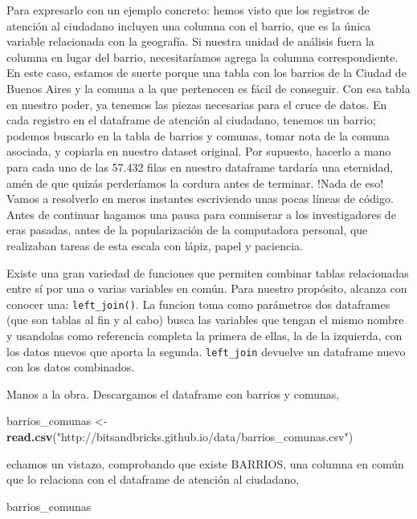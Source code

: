 \documentclass[]{book}
\newenvironment{Shaded}{\begin{snugshade}}{\end{snugshade}}
\newcommand{\KeywordTok}[1]{\textcolor[rgb]{0.13,0.29,0.53}{\textbf{#1}}}
\newcommand{\StringTok}[1]{\textcolor[rgb]{0.31,0.60,0.02}{#1}}
\newcommand{\NormalTok}[1]{#1}
\begin{document}
Para expresarlo con un ejemplo concreto: hemos visto que los registros
de atención al ciudadano incluyen una columna con el barrio, que es la
única variable relacionada con la geografía. Si nuestra unidad de
análisis fuera la columna en lugar del barrio, necesitaríamos agrega la
columna correspondiente. En este caso, estamos de suerte porque una
tabla con los barrios de la Ciudad de Buenos Aires y la comuna a la que
pertenecen es fácil de conseguir. Con esa tabla en nuestro poder, ya
tenemos las piezas necesarias para el cruce de datos. En cada registro
en el dataframe de atención al ciudadano, tenemos un barrio; podemos
buscarlo en la tabla de barrios y comunas, tomar nota de la comuna
asociada, y copiarla en nuestro dataset original. Por supuesto, hacerlo
a mano para cada uno de las 57.432 filas en nuestro dataframe tardaría
una eternidad, amén de que quizás perderíamos la cordura antes de
terminar. !Nada de eso! Vamos a resolverlo en meros instantes
escriviendo unas pocas líneas de código. Antes de continuar hagamos una
pausa para conmiserar a los investigadores de eras pasadas, antes de la
popularización de la computadora personal, que realizaban tareas de esta
escala con lápiz, papel y paciencia.

Existe una gran variedad de funciones que permiten combinar tablas
relacionadas entre sí por una o varias variables en común. Para nuestro
propósito, alcanza con conocer una: \texttt{left\_join()}. La funcion
toma como parámetros dos dataframes (que son tablas al fin y al cabo)
busca las variables que tengan el mismo nombre y usandolas como
referencia completa la primera de ellas, la de la izquierda, con los
datos nuevos que aporta la segunda. \texttt{left\_join} devuelve un
dataframe nuevo con los datos combinados.

Manos a la obra. Descargamos el dataframe con barrios y comunas,

\begin{Shaded}
\begin{Highlighting}[]
\NormalTok{barrios_comunas <-}\StringTok{ }\KeywordTok{read.csv}\NormalTok{(}\StringTok{"http://bitsandbricks.github.io/data/barrios_comunas.csv"}\NormalTok{)}
\end{Highlighting}
\end{Shaded}

echamos un vistazo, comprobando que existe BARRIOS, una columna en común
que lo relaciona con el dataframe de atención al ciudadano,

\begin{Shaded}
\begin{Highlighting}[]
\NormalTok{barrios_comunas}
\end{Highlighting}
\end{Shaded}
\end{document}
